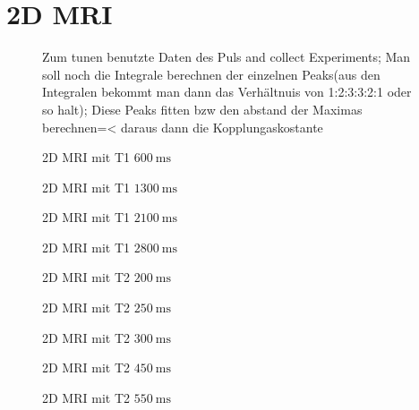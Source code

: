 \section{2D MRI}
\begin{figure}[H]
    \centering
    
    \caption{Zum tunen benutzte Daten des Puls and collect Experiments; Man soll noch die Integrale berechnen der einzelnen Peaks(aus den Integralen bekommt man dann das Verhältnuis von 1:2:3:3:2:1 oder so halt); Diese Peaks fitten bzw den abstand der Maximas berechnen=< daraus dann die Kopplungaskostante}
\end{figure}

\begin{figure}[H]
    \centering
    
    \caption{2D MRI mit T1 $\SI{600}{\milli\second}$}
\end{figure}

\begin{figure}[H]
    \centering
    
    \caption{2D MRI mit T1 $\SI{1300}{\milli\second}$}
\end{figure}
\begin{figure}[H]
    \centering
    
    \caption{2D MRI mit T1 $\SI{2100}{\milli\second}$}
\end{figure}
\begin{figure}[H]
    \centering
    
    \caption{2D MRI mit T1 $\SI{2800}{\milli\second}$}
\end{figure}

\begin{figure}[H]
    \centering
    
    \caption{2D MRI mit T2 $\SI{200}{\milli\second}$}
\end{figure}
\begin{figure}[H]
    \centering
    
    \caption{2D MRI mit T2 $\SI{250}{\milli\second}$}
\end{figure}
\begin{figure}[H]
    \centering
    
    \caption{2D MRI mit T2 $\SI{300}{\milli\second}$}
\end{figure}
\begin{figure}[H]
    \centering
    
    \caption{2D MRI mit T2 $\SI{450}{\milli\second}$}
\end{figure}
\begin{figure}[H]
    \centering
    
    \caption{2D MRI mit T2 $\SI{550}{\milli\second}$}
\end{figure}